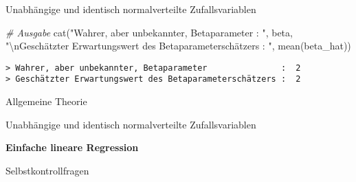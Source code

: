 \documentclass[
  8pt,
  ignorenonframetext,
]{beamer}
\newenvironment{Shaded}{\begin{snugshade}}{\end{snugshade}}
\newcommand{\CommentTok}[1]{\textcolor[rgb]{0.56,0.35,0.01}{\textit{#1}}}
\newcommand{\FunctionTok}[1]{\textcolor[rgb]{0.00,0.00,0.00}{#1}}
\newcommand{\NormalTok}[1]{#1}
\newcommand{\SpecialCharTok}[1]{\textcolor[rgb]{0.00,0.00,0.00}{#1}}
\newcommand{\StringTok}[1]{\textcolor[rgb]{0.31,0.60,0.02}{#1}}
\begin{document}
\begin{frame}[fragile]{Unabhängige und identisch normalverteilte
Zufallsvariablen}
\begin{Shaded}
\begin{Highlighting}[]
\CommentTok{\# Ausgabe}
\FunctionTok{cat}\NormalTok{(}\StringTok{"Wahrer, aber unbekannter, Betaparameter               : "}\NormalTok{, beta,}
    \StringTok{"}\SpecialCharTok{\textbackslash{}n}\StringTok{Geschätzter Erwartungswert des Betaparameterschätzers : "}\NormalTok{, }\FunctionTok{mean}\NormalTok{(beta\_hat))}
\end{Highlighting}
\end{Shaded}

\begin{verbatim}
> Wahrer, aber unbekannter, Betaparameter               :  2 
> Geschätzter Erwartungswert des Betaparameterschätzers :  2
\end{verbatim}
\end{frame}

\begin{frame}{}
\protect\hypertarget{section-5}{}
\large
{}
\vfill

Allgemeine Theorie

Unabhängige und identisch normalverteilte Zufallsvariablen

\textbf{Einfache lineare Regression}

Selbstkontrollfragen \vfill
\end{frame}
\end{document}
